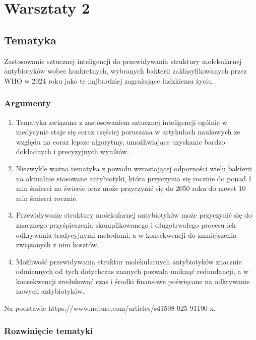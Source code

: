 \chapter{Warsztaty 2}
\section{Tematyka}

Zastosowanie sztucznej inteligencji do przewidywania struktury molekularnej antybiotyków wobec konkretnych, wybranych bakterii zaklasyfikowanych przez WHO w 2024 roku jako te najbardziej zagrażające ludzkiemu życiu.

\subsection{Argumenty}

\begin{enumerate}
    \item Tematyka związana z zastosowaniem sztucznej inteligencji ogólnie w medycynie staje się coraz częściej poruszana w artykułach naukowych ze względu na coraz lepsze algorytmy, umożliwiające uzyskanie bardzo dokładnych i precyzyjnych wyników.
    \item Niezwykle ważna tematyka z powodu wzrastającej odporności wielu bakterii na aktualnie stosowane antybiotyki, która przyczynia się rocznie do ponad 1 mln śmierci na świecie oraz może przyczynić się do 2050 roku do nawet 10 mln śmierci rocznie.
    \item Przewidywanie struktury molekularnej antybiotyków może przyczynić się do znacznego przyśpieszenia skomplikowanego i długotrwałego procesu ich odkrywania tradycyjnymi metodami, a w konsekwencji do zmniejszenia związanych z nim kosztów.
    \item Możliwość przewidywania struktur molekularnych antybiotyków znacznie odmiennych od tych dotychczas znanych pozwala uniknąć redundancji, a w konsekwencji zredukować czas i środki finansowe poświęcane na odkrywanie nowych antybiotyków.
\end{enumerate}

Na podstawie https://www.nature.com/articles/s41598-025-91190-x.

\subsection{Rozwinięcie tematyki}

